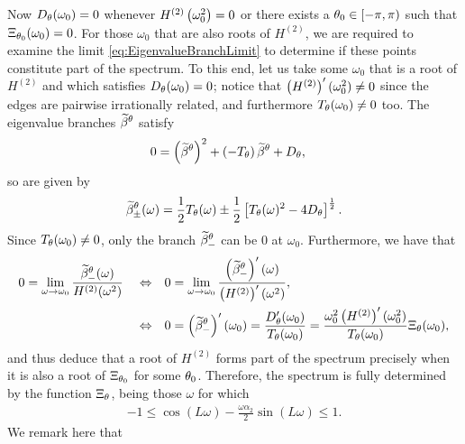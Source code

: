 Now $D_{\theta}(\omega_0)=0$ whenever $H^{(2)}\left( \omega_0^2 \right)=0$ or there exists a $\theta_0\in[-\pi,\pi)$ such that $\Xi_{\theta_0}(\omega_0)=0$.
For those $\omega_0$ that are also roots of $H^{(2)}$, we are required to examine the limit \eqref{eq:EigenvalueBranchLimit} to determine if these points constitute part of the spectrum.
To this end, let us take some $\omega_0$ that is a root of $H^{(2)}$ and which satisfies $D_{\theta}(\omega_0)=0$; notice that $\left( H^{(2)} \right)'(\omega_0^2)\neq 0$ since the edges are pairwise irrationally related, and furthermore $T_{\theta}(\omega_0)\neq0$ too.
The eigenvalue branches $\widetilde{\beta}^{\theta}$ satisfy
\begin{align*}
	0 &= \left( \widetilde{\beta}^{\theta} \right)^2 + \left( -T_{\theta} \right)\widetilde{\beta}^{\theta} + D_{\theta},
\end{align*}
so are given by
\begin{align*}
	\widetilde{\beta}_{\pm}^{\theta}(\omega) = \frac{1}{2}T_{\theta}(\omega) \pm \frac{1}{2}\left[ T_{\theta}(\omega)^2 - 4D_{\theta}  \right]^{\frac{1}{2}}.
\end{align*}
Since $T_{\theta}(\omega_0)\neq0$, only the branch $\widetilde{\beta}_{-}^{\theta}$ can be $0$ at $\omega_0$.
Furthermore, we have that
\begin{align*}
	0 = \lim_{\omega\rightarrow\omega_0} \frac{\widetilde{\beta}_{-}^{\theta}(\omega)}{H^{(2)}(\omega^2)}
	\quad\Leftrightarrow\quad &
	0 = \lim_{\omega\rightarrow\omega_0} \frac{\left( \widetilde{\beta}_{-}^{\theta} \right)'(\omega)}{\left( H^{(2)} \right)'(\omega^2)}, \\
	\quad\Leftrightarrow\quad &
	0 = \left( \widetilde{\beta}_{-}^{\theta} \right)'(\omega_0)
	= \frac{D'_{\theta}(\omega_0)}{T_{\theta}(\omega_0)}
	= \frac{\omega_0^2 \left( H^{(2)} \right)'(\omega_0^2)}{T_{\theta}(\omega_0)}\Xi_{\theta}(\omega_0),
\end{align*}
and thus deduce that a root of $H^{(2)}$ forms part of the spectrum precisely when it is also a root of $\Xi_{\theta_0}$ for some $\theta_0$.
Therefore, the spectrum is fully determined by the function $\Xi_{\theta}$, being those $\omega$ for which
\begin{align*}
	-1 \leq \cos(L\omega) - \frac{\omega\alpha_2}{2}\sin(L\omega) \leq 1.
\end{align*}
We remark here that 